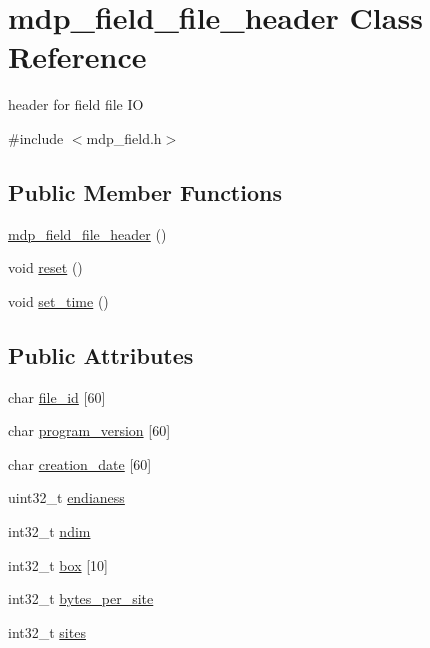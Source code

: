 \hypertarget{classmdp__field__file__header}{
\section{mdp\_\-field\_\-file\_\-header Class Reference}
\label{classmdp__field__file__header}
}


header for field file IO  


{\ttfamily \#include $<$mdp\_\-field.h$>$}\subsection*{Public Member Functions}
\begin{DoxyCompactItemize}
\item 
\hyperlink{classmdp__field__file__header_ab097916f6edf2141bf8219384c5c2d95}{mdp\_\-field\_\-file\_\-header} ()
\item 
void \hyperlink{classmdp__field__file__header_a818d41240687af568d930b91ac687299}{reset} ()
\item 
void \hyperlink{classmdp__field__file__header_a6f944ea85e7d6176900139768098844a}{set\_\-time} ()
\end{DoxyCompactItemize}
\subsection*{Public Attributes}
\begin{DoxyCompactItemize}
\item 
char \hyperlink{classmdp__field__file__header_ab1b8a05b7908871a5cedff9e0bfc33fa}{file\_\-id} \mbox{[}60\mbox{]}
\item 
char \hyperlink{classmdp__field__file__header_abb1bd41d1e209241fb85b0996fed9765}{program\_\-version} \mbox{[}60\mbox{]}
\item 
char \hyperlink{classmdp__field__file__header_abc00b44219d97450f858530e2f357bd5}{creation\_\-date} \mbox{[}60\mbox{]}
\item 
uint32\_\-t \hyperlink{classmdp__field__file__header_aabc93969ba727e3e368608e21767a8d1}{endianess}
\item 
int32\_\-t \hyperlink{classmdp__field__file__header_a530fb61672665d9fc563d5c25c14aafb}{ndim}
\item 
int32\_\-t \hyperlink{classmdp__field__file__header_a4354675f8beac1523480de46d3441357}{box} \mbox{[}10\mbox{]}
\item 
int32\_\-t \hyperlink{classmdp__field__file__header_a904de1a1c617f55536ea6961693646f2}{bytes\_\-per\_\-site}
\item 
int32\_\-t \hyperlink{classmdp__field__file__header_a428a51466f48e613f85f9f9875a726bc}{sites}
\end{DoxyCompactItemize}
